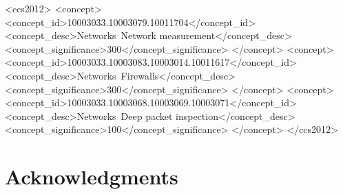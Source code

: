\documentclass{sig-alternate-05-2015}
\begin{document}
\maketitle



%
%
\begin{CCSXML}
<ccs2012>
<concept>
<concept_id>10003033.10003079.10011704</concept_id>
<concept_desc>Networks~Network measurement</concept_desc>
<concept_significance>300</concept_significance>
</concept>
<concept>
<concept_id>10003033.10003083.10003014.10011617</concept_id>
<concept_desc>Networks~Firewalls</concept_desc>
<concept_significance>300</concept_significance>
</concept>
<concept>
<concept_id>10003033.10003068.10003069.10003071</concept_id>
<concept_desc>Networks~Deep packet inspection</concept_desc>
<concept_significance>100</concept_significance>
</concept>
</ccs2012>
\end{CCSXML}


%
%

%
%
\printccsdesc










\section{Acknowledgments}

%

\end{document}
